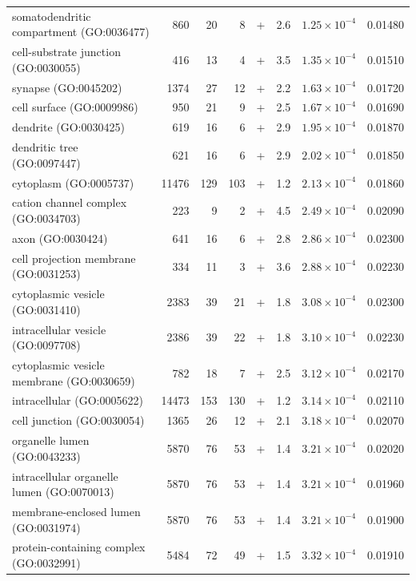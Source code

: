 \begin{table}[ht]
\begin{adjustbox}{width=\textwidth}
\begin{tabular}{lrrrlrrr}
  somatodendritic compartment (GO:0036477) & 860 & 20 & 8 & + & 2.6 & $1.25 \times 10^{-4}$ & 0.01480 \\ 
  cell-substrate junction (GO:0030055) & 416 & 13 & 4 & + & 3.5 & $1.35 \times 10^{-4}$ & 0.01510 \\ 
  synapse (GO:0045202) & 1374 & 27 & 12 & + & 2.2 & $1.63 \times 10^{-4}$ & 0.01720 \\ 
  cell surface (GO:0009986) & 950 & 21 & 9 & + & 2.5 & $1.67 \times 10^{-4}$ & 0.01690 \\ 
  dendrite (GO:0030425) & 619 & 16 & 6 & + & 2.9 & $1.95 \times 10^{-4}$ & 0.01870 \\ 
  dendritic tree (GO:0097447) & 621 & 16 & 6 & + & 2.9 & $2.02 \times 10^{-4}$ & 0.01850 \\ 
  cytoplasm (GO:0005737) & 11476 & 129 & 103 & + & 1.2 & $2.13 \times 10^{-4}$ & 0.01860 \\ 
  cation channel complex (GO:0034703) & 223 & 9 & 2 & + & 4.5 & $2.49 \times 10^{-4}$ & 0.02090 \\ 
  axon (GO:0030424) & 641 & 16 & 6 & + & 2.8 & $2.86 \times 10^{-4}$ & 0.02300 \\ 
  cell projection membrane (GO:0031253) & 334 & 11 & 3 & + & 3.6 & $2.88 \times 10^{-4}$ & 0.02230 \\ 
  cytoplasmic vesicle (GO:0031410) & 2383 & 39 & 21 & + & 1.8 & $3.08 \times 10^{-4}$ & 0.02300 \\ 
  intracellular vesicle (GO:0097708) & 2386 & 39 & 22 & + & 1.8 & $3.10 \times 10^{-4}$ & 0.02230 \\ 
  cytoplasmic vesicle membrane (GO:0030659) & 782 & 18 & 7 & + & 2.5 & $3.12 \times 10^{-4}$ & 0.02170 \\ 
  intracellular (GO:0005622) & 14473 & 153 & 130 & + & 1.2 & $3.14 \times 10^{-4}$ & 0.02110 \\ 
  cell junction (GO:0030054) & 1365 & 26 & 12 & + & 2.1 & $3.18 \times 10^{-4}$ & 0.02070 \\ 
  organelle lumen (GO:0043233) & 5870 & 76 & 53 & + & 1.4 & $3.21 \times 10^{-4}$ & 0.02020 \\ 
  intracellular organelle lumen (GO:0070013) & 5870 & 76 & 53 & + & 1.4 & $3.21 \times 10^{-4}$ & 0.01960 \\ 
  membrane-enclosed lumen (GO:0031974) & 5870 & 76 & 53 & + & 1.4 & $3.21 \times 10^{-4}$ & 0.01900 \\ 
  protein-containing complex (GO:0032991) & 5484 & 72 & 49 & + & 1.5 & $3.32 \times 10^{-4}$ & 0.01910 \\ 

\end{tabular}
\end{adjustbox}
\end{table}
